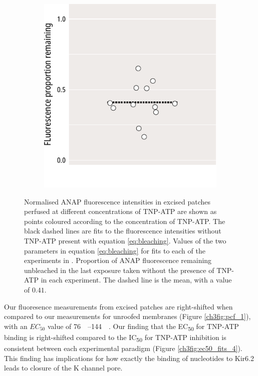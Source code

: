 \begin{figure}[h]
\begin{subfigure}[t]{0.45\textwidth}
	\end{subfigure}
	\hfill
	\begin{subfigure}[t]{0.45\textwidth}
		\caption{}\label{ch3fig:bleaching_terms_2}
		\centering
		\includegraphics[width=\textwidth]{bleaching_terms_2.pdf}
	\end{subfigure}
	\caption[PCF bleaching correction]{
	 Normalised ANAP fluorescence intensities in excised patches perfused at different concentrations of TNP-ATP are shown as points coloured according to the concentration of TNP-ATP.
	The black dashed lines are fits to the fluorescence intensities without TNP-ATP present with equation \ref{eq:bleaching}.
	 Values of the two parameters in equation \ref{eq:bleaching} for fits to each of the experiments in .
	 Proportion of ANAP fluorescence remaining unbleached in the last exposure taken without the presence of TNP-ATP in each experiment.
	The dashed line is the mean, with a value of $0.41$.
	}\label{ch3fig:pcf_bleaching}
\end{figure}

Our fluoresence measurements from excised patches are right-shifted when compared to our measurements for unroofed membranes (Figure \ref{ch3fig:pcf_1}), with an $EC_{50}$ value of \SIrange{76}{144}{\micro\Molar}.
Our finding that the EC\textsubscript{50} for TNP-ATP binding is right-shifted compared to the IC\textsubscript{50} for TNP-ATP inhibition is consistent between each experimental paradigm (Figure \ref{ch3fig:ec50_fits_4}).
This finding has implications for how exactly the binding of nucleotides to Kir6.2 leads to closure of the K\ATP{} channel pore.

